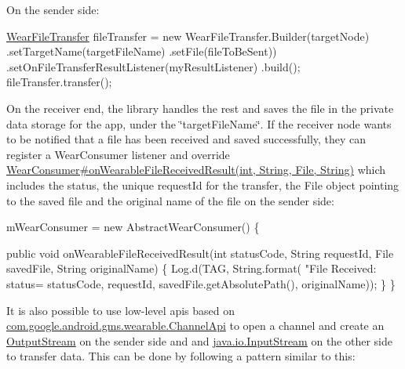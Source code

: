 On the sender side\+: 
\begin{DoxyPre}
\hyperlink{classcom_1_1google_1_1devrel_1_1wcl_1_1connectivity_1_1WearFileTransfer}{WearFileTransfer} fileTransfer = new WearFileTransfer.Builder(targetNode)
    .setTargetName(targetFileName)
    .setFile(fileToBeSent))
    .setOnFileTransferResultListener(myResultListener)
    .build();
fileTransfer.transfer();
\end{DoxyPre}
 On the receiver end, the library handles the rest and saves the file in the private data storage for the app, under the \char`\"{}target\+File\+Name\char`\"{}. If the receiver node wants to be notified that a file has been received and saved successfully, they can register a Wear\+Consumer listener and override \hyperlink{interfacecom_1_1google_1_1devrel_1_1wcl_1_1callbacks_1_1WearConsumer_a5dbc5ac2372eb9f0833ae5ebfb0a2c9c}{Wear\+Consumer\#on\+Wearable\+File\+Received\+Result(int, String, File, String)} which includes the status, the unique request\+Id for the transfer, the File object pointing to the saved file and the original name of the file on the sender side\+: 
\begin{DoxyPre}
mWearConsumer = new AbstractWearConsumer() \{\end{DoxyPre}



\begin{DoxyPre}    public void onWearableFileReceivedResult(int statusCode, String requestId,
            File savedFile, String originalName) \{
        Log.d(TAG, String.format(
            "File Received: status=%
            statusCode, requestId, savedFile.getAbsolutePath(), originalName));
    \}
\}
\end{DoxyPre}
 It is also possible to use low-\/level apis based on \hyperlink{}{com.\+google.\+android.\+gms.\+wearable.\+Channel\+Api} to open a channel and create an \hyperlink{}{Output\+Stream} on the sender side and and \hyperlink{}{java.\+io.\+Input\+Stream} on the other side to transfer data. This can be done by following a pattern similar to this\+:

